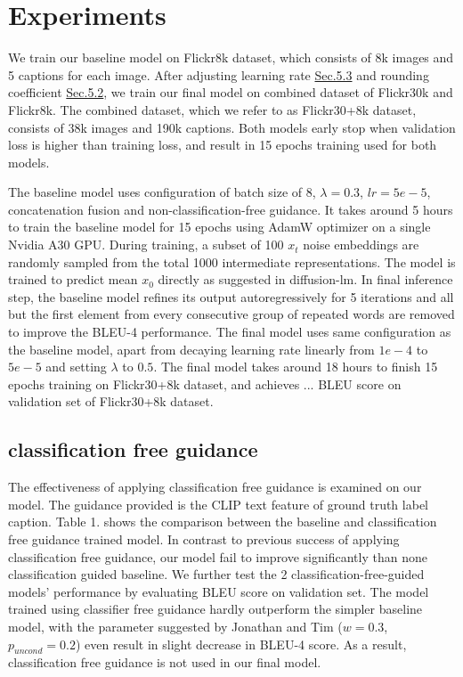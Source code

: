 \documentclass{article}
\begin{document}
\section{Experiments}
We train our baseline model on Flickr8k\cite{flickr8k} dataset, which consists of 8k images and 5 captions for each image. After adjusting learning rate \hyperref[sec:lr-exp]{Sec.5.3} and rounding coefficient \hyperref[sec:lambda-exp]{Sec.5.2}, we train our final model on combined dataset of Flickr30k\cite{flickr30k} and Flickr8k\cite{flickr8k}. The combined dataset, which we refer to as Flickr30+8k dataset, consists of 38k images and 190k captions. Both models early stop when validation loss is higher than training loss, and result in 15 epochs training used for both models.

The baseline model uses configuration of batch size of 8, $\lambda = 0.3$, $lr = 5e-5$, concatenation fusion and non-classification-free guidance. It takes around 5 hours to train the baseline model for 15 epochs using AdamW optimizer on a single Nvidia A30 GPU. During training, a subset of 100 $x_t$ noise embeddings are randomly sampled from the total 1000 intermediate representations. The model is trained to predict mean $x_0$ directly as suggested in diffusion-lm\cite{diffuselm}. In final inference step, the baseline model refines its output autoregressively for 5 iterations and all but the first element from every consecutive group of repeated words are removed to improve the BLEU-4 performance. The final model uses same configuration as the baseline model, apart from decaying learning rate linearly from $1e-4$ to $5e-5$ and setting $\lambda$ to $0.5$. The final model takes around 18 hours to finish 15 epochs training on Flickr30+8k dataset, and achieves ... BLEU score on validation set of Flickr30+8k dataset.

\subsection{classification free guidance}
\label{sec:classification-free-exp}
The effectiveness of applying classification free guidance is examined on our model. The guidance provided is the CLIP text feature of ground truth label caption. Table 1. shows the comparison between the baseline and classification free guidance trained model. In contrast to previous success of applying classification free guidance, our model fail to improve significantly than none classification guided baseline. We further test the 2 classification-free-guided models' performance by evaluating BLEU score on validation set. The model trained using classifier free guidance hardly outperform the simpler baseline model, with the parameter suggested by Jonathan and Tim \cite{classifier-free} ($w = 0.3$, $p_{uncond} = 0.2$) even result in slight decrease in BLEU-4 score. As a result, classification free guidance is not used in our final model.
\end{document}
